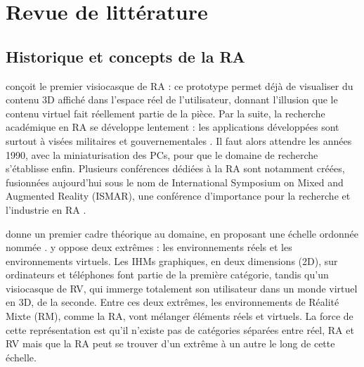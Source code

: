 \chapter{Revue de littérature}
\label{ch:litterature}

\section{Historique et concepts de la RA}
\label{sec:litterature_ar}

\cite{Sutherland1968} conçoit le premier visiocasque de RA  : ce prototype permet déjà de visualiser du contenu 3D affiché dans l'espace réel de l'utilisateur, donnant l'illusion que le contenu virtuel fait réellement partie de la pièce. Par la suite, la recherche académique en RA se développe lentement : les applications développées sont surtout à visées militaires et gouvernementales \citep{VanKrevelen2010}. Il faut alors attendre les années 1990, avec la miniaturisation des PCs, pour que le domaine de recherche s'établisse enfin. Plusieurs conférences dédiées à la RA sont notamment créées, fusionnées aujourd'hui sous le nom de International Symposium on Mixed and Augmented Reality (ISMAR), une conférence d'importance pour la recherche et l'industrie en RA \citep{Azuma2001}.


\cite{Milgram1994} donne un premier cadre théorique au domaine, en proposant une échelle ordonnée nommée  . \citeauthor{Milgram1994} y oppose deux extrêmes : les environnements réels et les environnements virtuels. Les IHMs graphiques, en deux dimensions (2D), sur ordinateurs et téléphones font partie de la première catégorie, tandis qu'un visiocasque de RV, qui immerge totalement son utilisateur dans un monde virtuel en 3D, de la seconde. Entre ces deux extrêmes, les environnements de Réalité Mixte (RM), comme la RA, vont mélanger éléments réels et virtuels. La force de cette représentation est qu'il n'existe pas de catégories séparées entre réel, RA et RV mais que la RA peut se trouver d'un extrême à un autre le long de cette échelle.

